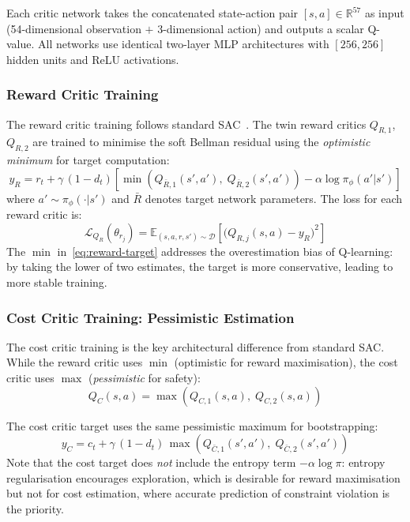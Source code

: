 Each critic network takes the concatenated state-action pair
$[s, a] \in \mathbb{R}^{57}$ as input (54-dimensional observation $+$
3-dimensional action) and outputs a scalar Q-value.  All networks use identical
two-layer MLP architectures with $[256, 256]$ hidden units and ReLU
activations.

\subsubsection{Reward Critic Training}

The reward critic training follows standard SAC~\cite{haarnoja2018sac}.  The
twin reward critics $Q_{R,1}$, $Q_{R,2}$ are trained to minimise the soft
Bellman residual using the \emph{optimistic minimum} for target computation:
\begin{equation}
  y_R = r_t + \gamma\,(1 - d_t)\!\left[
    \min\!\left(Q_{\bar{R},1}(s', a'),\; Q_{\bar{R},2}(s', a')\right)
    - \alpha \log \pi_\phi(a'|s')
  \right]
  \label{eq:reward-target}
\end{equation}
where $a' \sim \pi_\phi(\cdot|s')$ and $\bar{R}$ denotes target network
parameters.  The loss for each reward critic is:
\begin{equation}
  \mathcal{L}_{Q_R}(\theta_{r_j}) = \mathbb{E}_{(s,a,r,s') \sim \mathcal{D}}
    \!\left[\bigl(Q_{R,j}(s,a) - y_R\bigr)^2\right]
  \label{eq:reward-critic-loss}
\end{equation}
The $\min$ in~\eqref{eq:reward-target} addresses the overestimation bias of
Q-learning: by taking the lower of two estimates, the target is more
conservative, leading to more stable training.

\subsubsection{Cost Critic Training: Pessimistic Estimation}

The cost critic training is the key architectural difference from standard
SAC.  While the reward critic uses $\min$ (optimistic for reward maximisation),
the cost critic uses $\max$ (\emph{pessimistic} for safety):
\begin{equation}
  Q_C(s,a) = \max\!\left(Q_{C,1}(s,a),\; Q_{C,2}(s,a)\right)
  \label{eq:cost-critic-max}
\end{equation}

The cost critic target uses the same pessimistic maximum for bootstrapping:
\begin{equation}
  y_C = c_t + \gamma\,(1 - d_t)\,\max\!\left(
    Q_{\bar{C},1}(s', a'),\; Q_{\bar{C},2}(s', a')
  \right)
  \label{eq:cost-target}
\end{equation}
Note that the cost target does \emph{not} include the entropy term
$-\alpha \log \pi$: entropy regularisation encourages exploration, which is
desirable for reward maximisation but not for cost estimation, where accurate
prediction of constraint violation is the priority.

